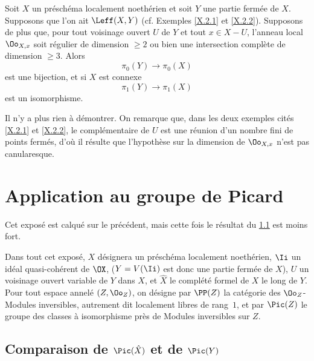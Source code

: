 \begin{theoreme} \label{X.3.10}
Soit $X$ un pr\'esch\'ema localement noeth\'erien et soit $Y$ une partie ferm\'ee de $X$. Supposons que l'on ait $\Leff(X, Y)$ (cf. Exemples \ref{X.2.1} et \ref{X.2.2}). Supposons de plus que, pour tout voisinage ouvert $U$ de $Y$ et tout $x\in X-U$, l'anneau local $\Oo_{X, x}$ soit r\'egulier de dimension $\geq2$ ou bien une intersection compl\`ete de dimension $\geq3$. Alors
\[
\pi_0(Y) \to \pi_0(X)
\]
est une bijection, et si $X$ est connexe
\[
\pi_1(Y) \to \pi_1(X)
\]
est un isomorphisme.
\end{theoreme}

Il n'y a plus rien \`a d\'emontrer. On remarque que, dans les deux exemples cit\'es \ref{X.2.1} et \ref{X.2.2}, le compl\'ementaire de $U$ est une r\'eunion d'un nombre fini de points ferm\'es, d'o\`u il r\'esulte que l'hypoth\`ese sur la dimension de $\Oo_{X, x}$ n'est pas canularesque.

\makeatletter{}\makeatother{}

\chapter{Application au groupe de Picard} \label{XI}

Cet expos\'e est calqu\'e sur le pr\'ec\'edent, mais cette fois le r\'esultat du \numero \ref{XI.1} est moins fort.

Dans tout cet expos\'e, $X$ d\'esignera un pr\'esch\'ema localement noeth\'erien, $\Ii$ un id\'eal quasi-coh\'erent de $\OX$, ($Y=V(\Ii)$ est donc une partie ferm\'ee de $X$), $U$ un voisinage ouvert variable de $Y$ dans $X$, et $\hat X$ le compl\'et\'e formel de $X$ le long de $Y$. Pour tout espace annel\'e $(Z, \Oo_Z)$, on d\'esigne par $\PP(Z)$\label{pXI.1} la cat\'egorie des $\Oo_Z$-Modules inversibles, autrement dit localement libres de rang~$1$, et par $\Pic(Z)$ le groupe des classes \`a isomorphisme pr\`es de Modules inversibles sur $Z$.

\section{Comparaison de $\Pic(\hat X)$ et de $\Pic(Y)$} \label{XI.1}

